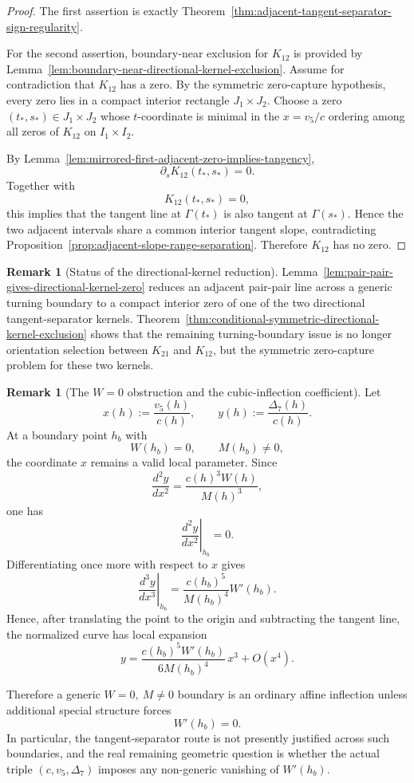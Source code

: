 \documentclass[11pt,a4paper]{amsart}
\theoremstyle{plain}
\theoremstyle{definition}
\newtheorem{remark}[theorem]{Remark}
\begin{document}
\begin{proof}
The first assertion is exactly
Theorem~\ref{thm:adjacent-tangent-separator-sign-regularity}.

For the second assertion, boundary-near exclusion for $K_{12}$ is provided by
Lemma~\ref{lem:boundary-near-directional-kernel-exclusion}. Assume for
contradiction that $K_{12}$ has a zero. By the symmetric zero-capture
hypothesis, every zero lies in a compact interior rectangle $J_1\times J_2$.
Choose a zero $(t_*,s_*)\in J_1\times J_2$ whose $t$-coordinate is minimal
in the $x=v_5/c$ ordering among all zeros of $K_{12}$ on $I_1\times I_2$.

By Lemma~\ref{lem:mirrored-first-adjacent-zero-implies-tangency},
\[
\partial_s K_{12}(t_*,s_*)=0.
\]
Together with
\[
K_{12}(t_*,s_*)=0,
\]
this implies that the tangent line at $\Gamma(t_*)$ is also tangent at
$\Gamma(s_*)$. Hence the two adjacent intervals share a common interior
tangent slope, contradicting
Proposition~\ref{prop:adjacent-slope-range-separation}. Therefore
$K_{12}$ has no zero.
\end{proof}

\begin{remark}[Status of the directional-kernel reduction]
\label{rem:status-directional-kernel-reduction}
Lemma~\ref{lem:pair-pair-gives-directional-kernel-zero} reduces an adjacent
pair-pair line across a generic turning boundary to a compact interior zero of
one of the two directional tangent-separator kernels.
Theorem~\ref{thm:conditional-symmetric-directional-kernel-exclusion}
shows that the remaining turning-boundary issue is no longer orientation
selection between $K_{21}$ and $K_{12}$, but the symmetric zero-capture
problem for these two kernels.
\end{remark}

\begin{remark}[The $W=0$ obstruction and the cubic-inflection coefficient]
\label{rem:w0-inflection-obstruction}
Let
\[
x(h):=\frac{v_5(h)}{c(h)},
\qquad
y(h):=\frac{\Delta_7(h)}{c(h)}.
\]
At a boundary point $h_b$ with
\[
W(h_b)=0,\qquad M(h_b)\neq 0,
\]
the coordinate $x$ remains a valid local parameter. Since
\[
\frac{d^2y}{dx^2}=\frac{c(h)^3W(h)}{M(h)^3},
\]
one has
\[
\left.\frac{d^2y}{dx^2}\right|_{h_b}=0.
\]
Differentiating once more with respect to $x$ gives
\[
\left.\frac{d^3y}{dx^3}\right|_{h_b}
=
\frac{c(h_b)^5}{M(h_b)^4}W'(h_b).
\]
Hence, after translating the point to the origin and subtracting the tangent
line, the normalized curve has local expansion
\[
y
=
\frac{c(h_b)^5W'(h_b)}{6M(h_b)^4}\,x^3+O(x^4).
\]

Therefore a generic $W=0,\ M\neq 0$ boundary is an ordinary affine inflection
unless additional special structure forces
\[
W'(h_b)=0.
\]
In particular, the tangent-separator route is not presently justified across
such boundaries, and the real remaining geometric question is whether the
actual triple $(c,v_5,\Delta_7)$ imposes any non-generic vanishing of
$W'(h_b)$.
\end{remark}
\end{document}
